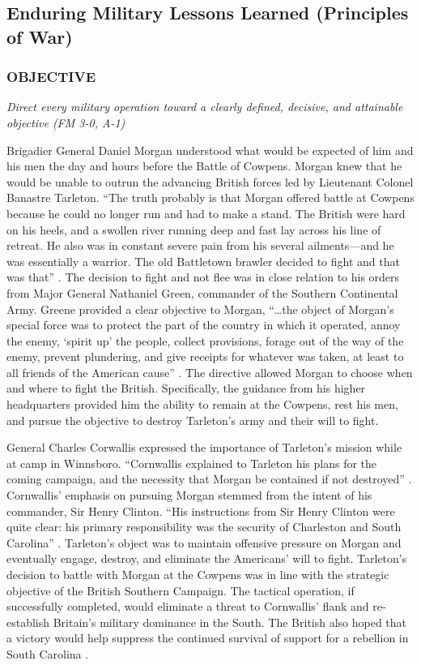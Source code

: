 \subsection{Enduring Military Lessons Learned (Principles of War)}

\subsubsection{OBJECTIVE}

\textit{Direct every military operation toward a clearly defined, decisive, and attainable objective (FM 3-0, A-1)}

Brigadier General Daniel Morgan understood what would be expected of him and
his men the day and hours before the Battle of Cowpens.  Morgan knew that he
would be unable to outrun the advancing British forces led by Lieutenant
Colonel Banastre Tarleton.  “The truth probably is that Morgan offered battle
at Cowpens because he could no longer run and had to make a stand.  The British
were hard on his heels, and a swollen river running deep and fast lay across
his line of retreat.  He also was in constant severe pain from his several
ailments—and he was essentially a warrior.  The old Battletown brawler decided
to fight and that was that” \cite[p.125]{lumpkin_savannah_1981}.  The decision to fight and not
flee was in close relation to his orders from Major General Nathaniel Green,
commander of the Southern Continental Army.  Greene provided a clear objective
to Morgan, “…the object of Morgan’s special force was to protect the part of
the country in which it operated, annoy the enemy, ‘spirit up’ the people,
collect provisions, forage out of the way of the enemy, prevent plundering, and
give receipts for whatever was taken, at least to all friends of the American
cause” \cite[p. 120]{lumpkin_savannah_1981}.  The directive allowed Morgan to choose when and
where to fight the British.  Specifically, the guidance from his higher
headquarters provided him the ability to remain at the Cowpens, rest his men,
and pursue the objective to destroy Tarleton’s army and their will to fight.  

General Charles Corwallis expressed the importance of Tarleton’s mission while
at camp in Winnsboro.  “Cornwallis explained to Tarleton his plans for the
coming campaign, and the necessity that Morgan be contained if not destroyed”
\cite[p.306]{buchanan_road_1997}.  Cornwallis’ emphasis on pursuing Morgan stemmed from the
intent of his commander, Sir Henry Clinton.  “His instructions from Sir Henry
Clinton were quite clear: his primary responsibility was the security of
Charleston and South Carolina” \cite[p.307]{buchanan_road_1997}.  Tarleton’s object was to
maintain offensive pressure on Morgan and eventually engage, destroy, and
eliminate the Americans’ will to fight.  Tarleton’s decision to battle with
Morgan at the Cowpens was in line with the strategic objective of the British
Southern Campaign.  The tactical operation, if successfully completed, would
eliminate a threat to Cornwallis’ flank and re-establish Britain’s military
dominance in the South.  The British also hoped that a victory would help
suppress the continued survival of support for a rebellion in South Carolina
\cite[p.307]{buchanan_road_1997}.   

